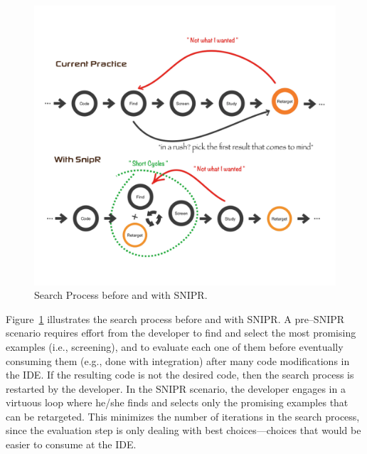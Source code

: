 \begin{figure}[!ht]
    \centering
    \includegraphics[width=\textwidth]{images/searchprocess}
    \caption{Search Process before and with \uppercase{SnipR}.}
    \label{fig:retargeting}
\end{figure}
\pagebreak

Figure~\ref{fig:retargeting} illustrates the search process before and with \uppercase{SnipR}. A pre--\uppercase{SnipR} scenario requires effort from the developer to find and select the most promising examples (i.e., screening), and to evaluate each one of them before eventually consuming them (e.g., done with integration) after many code modifications in the IDE. If the resulting code is not the desired code, then the search process is restarted by the developer. In the \uppercase{SnipR} scenario, the developer engages in a virtuous loop where he/she finds and selects only the promising examples that can be retargeted. This minimizes the number of iterations in the search process, since the evaluation step is only dealing with best choices---choices that would be easier to consume at the IDE.

